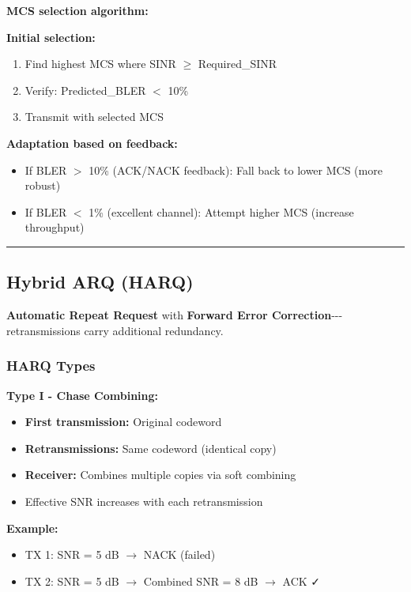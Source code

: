 \textbf{MCS selection algorithm:}

\textbf{Initial selection:}
\begin{enumerate}
\item Find highest MCS where SINR $\geq$ Required\_SINR
\item Verify: Predicted\_BLER $<$ 10\%
\item Transmit with selected MCS
\end{enumerate}

\textbf{Adaptation based on feedback:}
\begin{itemize}
\item If BLER $>$ 10\% (ACK/NACK feedback): Fall back to lower MCS (more robust)
\item If BLER $<$ 1\% (excellent channel): Attempt higher MCS (increase throughput)
\end{itemize}

\begin{center}\rule{0.5\linewidth}{0.5pt}\end{center}

\subsection{Hybrid ARQ (HARQ)}\label{hybrid-arq-harq}

\textbf{Automatic Repeat Request} with \textbf{Forward Error
Correction}-\/-\/-retransmissions carry additional redundancy.

\subsubsection{HARQ Types}\label{harq-types}

\textbf{Type I - Chase Combining:}
\begin{itemize}
\item \textbf{First transmission:} Original codeword
\item \textbf{Retransmissions:} Same codeword (identical copy)
\item \textbf{Receiver:} Combines multiple copies via soft combining
\item Effective SNR increases with each retransmission
\end{itemize}

\textbf{Example:}
\begin{itemize}
\item TX 1: SNR = 5 dB $\rightarrow$ NACK (failed)
\item TX 2: SNR = 5 dB $\rightarrow$ Combined SNR = 8 dB $\rightarrow$ ACK ✓
\end{itemize}

